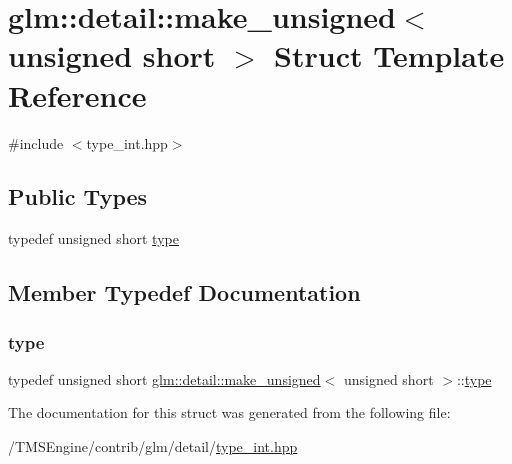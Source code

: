 \hypertarget{structglm_1_1detail_1_1make__unsigned_3_01unsigned_01short_01_4}{}\section{glm\+:\+:detail\+:\+:make\+\_\+unsigned$<$ unsigned short $>$ Struct Template Reference}
\label{structglm_1_1detail_1_1make__unsigned_3_01unsigned_01short_01_4}


{\ttfamily \#include $<$type\+\_\+int.\+hpp$>$}

\subsection*{Public Types}
\begin{DoxyCompactItemize}
\item 
typedef unsigned short \hyperlink{structglm_1_1detail_1_1make__unsigned_3_01unsigned_01short_01_4_a42829000435f69c3a00675b6914f0d33}{type}
\end{DoxyCompactItemize}


\subsection{Member Typedef Documentation}
\mbox{\label{structglm_1_1detail_1_1make__unsigned_3_01unsigned_01short_01_4_a42829000435f69c3a00675b6914f0d33}} 
\subsubsection{\texorpdfstring{type}{type}}
{\footnotesize\ttfamily typedef unsigned short \hyperlink{structglm_1_1detail_1_1make__unsigned}{glm\+::detail\+::make\+\_\+unsigned}$<$ unsigned short $>$\+::\hyperlink{structglm_1_1detail_1_1make__unsigned_3_01unsigned_01short_01_4_a42829000435f69c3a00675b6914f0d33}{type}}



The documentation for this struct was generated from the following file\+:\begin{DoxyCompactItemize}
\item 
/\+T\+M\+S\+Engine/contrib/glm/detail/\hyperlink{type__int_8hpp}{type\+\_\+int.\+hpp}\end{DoxyCompactItemize}
